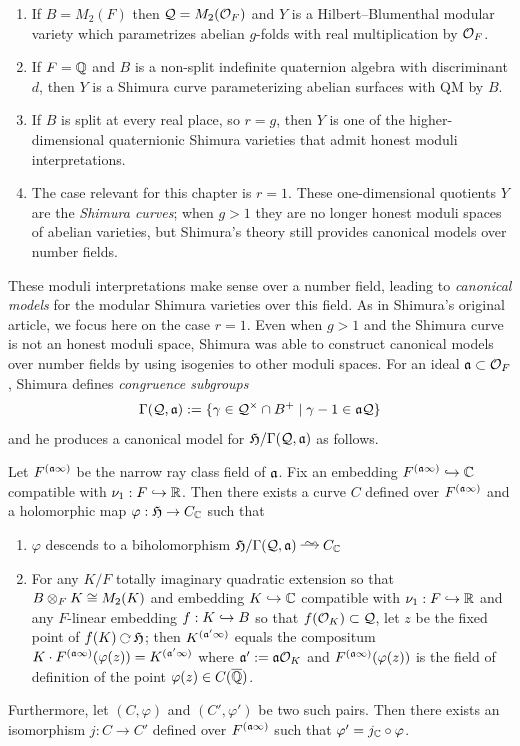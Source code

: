 \documentclass[main.tex]{subfiles}
\begin{document}
\begin{enumerate}
    \item If $B = M_2(F)$ then $\cQ = M_2(\cO_F)$ and $Y$ is a Hilbert--Blumenthal modular variety which parametrizes abelian $g$-folds with real multiplication by $\cO_F$.
    \item If $F = \Q$ and $B$ is a non-split indefinite quaternion algebra with discriminant $d$, then $Y$ is a Shimura curve parameterizing abelian surfaces with QM by $B$.
    \item If $B$ is split at every real place, so $r = g$, then $Y$ is one of the higher-dimensional quaternionic Shimura varieties that admit honest moduli interpretations.
    \item The case relevant for this chapter is $r = 1$. These one-dimensional quotients $Y$ are the \textit{Shimura curves}; when $g > 1$ they are no longer honest moduli spaces of abelian varieties, but Shimura's theory still provides canonical models over number fields.
\end{enumerate}

These moduli interpretations make sense over a number field, leading to \textit{canonical models} for the modular Shimura varieties over this field. As in Shimura's original article, we focus here on the case $r = 1$. Even when $g > 1$ and the Shimura curve is not an honest moduli space, Shimura was able to construct canonical models over number fields by using isogenies to other moduli spaces. For an ideal $\aa \subset \cO_F$, Shimura defines \textit{congruence subgroups}
\[ \Gamma(\cQ, \aa) := \{ \gamma \in \cQ^\times \cap B^+ \mid \gamma - 1 \in \aa \cQ \} \]
and he produces a canonical model for $\frH / \Gamma(\cQ, \aa)$ as follows.

\begin{theorem}\cite[(3.2) Main Theorem I and (3.3)]{shimura:curves} \label{thm:canonical_models}
Let $F^{(\aa \infty)}$ be the narrow ray class field of $\aa$. Fix an embedding $F^{(\aa \infty)} \embed \CC$ compatible with $\nu_1 : F \embed \RR$. Then there exists a curve $C$ defined over $F^{(\aa \infty)}$ and a holomorphic map $\varphi : \frH \to C_{\CC}$ such that
\begin{enumerate}
    \item $\varphi$ descends to a biholomorphism $\frH /\Gamma(\cQ, \aa) \iso C_{\CC}$
    \item For any $K/F$ totally imaginary quadratic extension so that $B \ot_F K \cong M_2(K)$ and embedding $K \embed \CC$ compatible with $\nu_1 : F \embed \RR$ and any $F$-linear embedding $f : K \embed B$ so that $f(\cO_K) \subset \cQ$, let $z$ be the fixed point of $f(K) \acts \frH$; then $K^{(\aa' \infty)}$ equals the compositum $K \cdot F^{(\aa \infty)}(\varphi(z)) = K^{(\aa' \infty)}$ where $\aa' := \aa \cO_K$ and $F^{(\aa \infty)}(\varphi(z))$ is the field of definition of the point $\varphi(z) \in C(\ol{\Q})$.
\end{enumerate}
Furthermore, let $(C, \varphi)$ and $(C', \varphi')$ be two such pairs. Then there exists an isomorphism $j : C \to C'$ defined over $F^{(\aa \infty)}$ such that $\varphi' = j_{\CC} \circ \varphi$.
\end{theorem}
\end{document}
